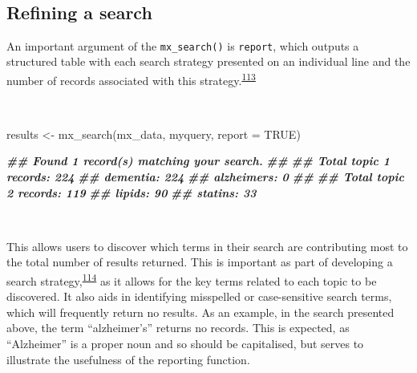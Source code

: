 \documentclass[a4paper, twoside]{templates/ociamthesis}
\newenvironment{Shaded}{\begin{snugshade}}{\end{snugshade}}
\newcommand{\AttributeTok}[1]{\textcolor[rgb]{0.77,0.63,0.00}{#1}}
\newcommand{\ConstantTok}[1]{\textcolor[rgb]{0.00,0.00,0.00}{#1}}
\newcommand{\DocumentationTok}[1]{\textcolor[rgb]{0.56,0.35,0.01}{\textbf{\textit{#1}}}}
\newcommand{\FunctionTok}[1]{\textcolor[rgb]{0.00,0.00,0.00}{#1}}
\newcommand{\NormalTok}[1]{#1}
\newcommand{\OtherTok}[1]{\textcolor[rgb]{0.56,0.35,0.01}{#1}}
\renewenvironment{Shaded}
{
  \vspace{4pt}%
  \begin{snugshade}%
}{%
  \end{snugshade}%
  \vspace{4pt}%
}
\begin{document}
~

\hypertarget{refining-a-search}{%
\subsection{Refining a search}\label{refining-a-search}}

An important argument of the \texttt{mx\_search()} is \texttt{report}, which outputs a structured table with each search strategy presented on an individual line and the number of records associated with this strategy.\textsuperscript{\protect\hyperlink{ref-rethlefsen2021prisma}{113}}

~

\begin{Shaded}
\begin{Highlighting}[]
\NormalTok{results  }\OtherTok{\textless{}{-}} \FunctionTok{mx\_search}\NormalTok{(mx\_data,}
\NormalTok{                      myquery,}
                      \AttributeTok{report =} \ConstantTok{TRUE}\NormalTok{)}
\end{Highlighting}
\end{Shaded}

\begin{Shaded}
\begin{Highlighting}[]
\DocumentationTok{\#\# Found 1 record(s) matching your search.}
\DocumentationTok{\#\# }
\DocumentationTok{\#\# Total topic 1 records: 224}
\DocumentationTok{\#\# dementia: 224}
\DocumentationTok{\#\# alzheimer\textquotesingle{}s: 0}
\DocumentationTok{\#\# }
\DocumentationTok{\#\# Total topic 2 records: 119}
\DocumentationTok{\#\# lipids: 90}
\DocumentationTok{\#\# statins: 33}
\end{Highlighting}
\end{Shaded}

~

This allows users to discover which terms in their search are contributing most to the total number of results returned. This is important as part of developing a search strategy,\textsuperscript{\protect\hyperlink{ref-bramer2018}{114}} as it allows for the key terms related to each topic to be discovered. It also aids in identifying misspelled or case-sensitive search terms, which will frequently return no results. As an example, in the search presented above, the term ``alzheimer's'' returns no records. This is expected, as ``Alzheimer'' is a proper noun and so should be capitalised, but serves to illustrate the usefulness of the reporting function.

~
\end{document}
